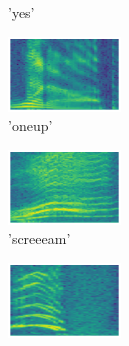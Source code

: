 \begin{figure}[H]
{\begin{subfigure}{0.23\textwidth}
{{        }\hspace*{0.75cm}%
      }%
      \caption*{'yes'}
    \end{subfigure}
    \begin{subfigure}{0.245\textwidth}
      \includegraphics[width=3cm]{sounds/buttons/25.wav-button.png}%
      \caption*{'oneup'}
    \end{subfigure}
    \begin{subfigure}{0.247\textwidth}
      \includegraphics[width=3cm]{sounds/buttons/26.wav-button.png}%
      \caption*{'screeeam'}
    \end{subfigure}
    \begin{subfigure}{0.247\textwidth}
      \includegraphics[width=3cm]{sounds/buttons/27.wav-button.png}%
\end{subfigure}}
\end{figure}
